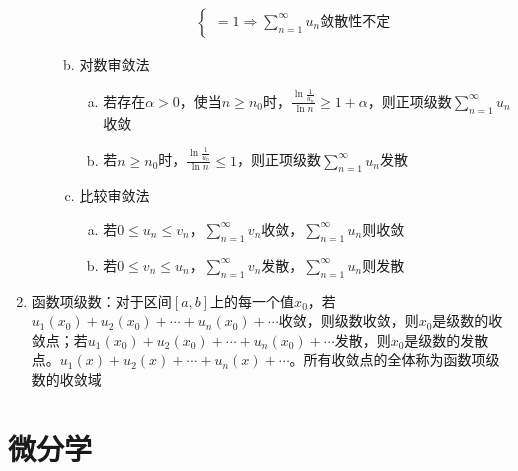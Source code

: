 \documentclass[12pt]{book}
\begin{document}
\begin{enumerate}[1.]
\begin{enumerate}[(1)]
\begin{enumerate}[a.]
\begin{gather*}
\begin{cases}
                    =1 \Rightarrow \sum_{n=1}^{\infty}{u_n} \text{敛散性不定} 
                \end{cases}
            \end{gather*}
            \item 对数审敛法
            \begin{enumerate}[(a)]
                \item 若存在$\alpha>0$，使当$n\geqslant n_0$时，$\frac{\ln{\frac{1}{u_n}}}{{\ln{n}}}\geqslant 1+\alpha$，则正项级数$\sum_{n=1}^{\infty}{u_n}$收敛
                \item 若$n\geqslant n_0$时，$\frac{\ln{\frac{1}{u_n}}}{{\ln{n}}}\leqslant 1$，则正项级数$\sum_{n=1}^{\infty}{u_n}$发散
            \end{enumerate}
            \item 比较审敛法
            \begin{enumerate}[(a)]
                \item 若$0\leqslant u_n \leqslant v_n$，$\sum_{n=1}^{\infty}{v_n}$收敛，$\sum_{n=1}^{\infty}{u_n}$则收敛
                \item 若$0\leqslant v_n \leqslant u_n$，$\sum_{n=1}^{\infty}{v_n}$发散，$\sum_{n=1}^{\infty}{u_n}$则发散
            \end{enumerate}
        \end{enumerate}
    \end{enumerate}
    \item 函数项级数：对于区间$[a,b]$上的每一个值$x_0$，若$u_1(x_0)+u_2(x_0)+\cdots+u_n(x_0)+\cdots$收敛，则级数收敛，则$x_0$是级数的收敛点；若$u_1(x_0)+u_2(x_0)+\cdots+u_n(x_0)+\cdots$发散，则$x_0$是级数的发散点。$u_1(x)+u_2(x)+\cdots+u_n(x)+\cdots$。所有收敛点的全体称为函数项级数的收敛域
\end{enumerate}




\chapter{微分学}
\end{document}
